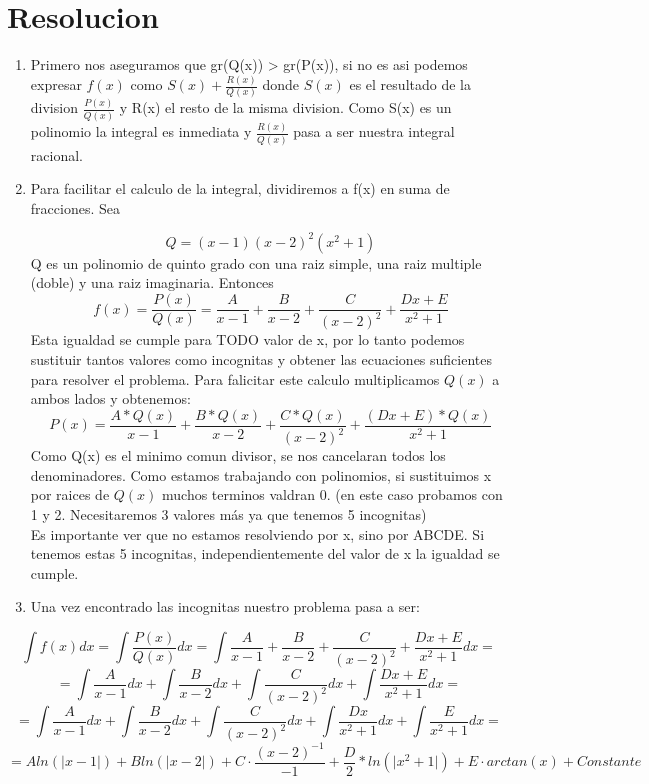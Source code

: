 \documentclass[11pt]{article}
\begin{document}
\section{Resolucion}
\label{sec:org24a41e5}
\begin{enumerate}
\item Primero nos aseguramos que gr(Q(x)) > gr(P(x)), si no es asi podemos expresar \(f(x)\)  como \(S(x) + \frac{R(x)}{Q(x)}\) donde \(S(x)\) es el resultado de la division \(\frac{P(x)}{Q(x)}\) y R(x) el resto de la misma division. Como S(x) es un polinomio la integral es inmediata y \(\frac{R(x)}{Q(x)}\) pasa a ser nuestra integral racional.

\item Para facilitar el calculo de la integral, dividiremos a f(x) en suma de fracciones. Sea

\[
Q = (x-1)(x-2)^{2}(x^{2}+1) 
\]
Q es un polinomio de quinto grado con una raiz simple, una raiz multiple (doble) y una raiz imaginaria. 
Entonces 
\[
f(x) = \frac{P(x)}{Q(x)} = \frac{A}{x-1} + \frac{B}{x-2} + \frac{C}{(x-2)^{2}} + \frac{Dx + E}{x^{2} + 1}
\]
Esta igualdad se cumple para TODO valor de x, por lo tanto podemos sustituir tantos valores como incognitas y obtener las ecuaciones suficientes para resolver el problema. Para falicitar este calculo multiplicamos \(Q(x)\) a ambos lados y obtenemos:
\[
P(x) = \frac{A*Q(x)}{x-1} + \frac{B*Q(x)}{x-2} + \frac{C*Q(x)}{(x-2)^{2}} + \frac{(Dx + E)*Q(x)}{x^{2} + 1}
\]
Como Q(x) es el minimo comun divisor, se nos cancelaran todos los denominadores. Como estamos trabajando con polinomios, si sustituimos x por raices de \(Q(x)\) muchos terminos valdran 0. (en este caso probamos con 1 y 2. Necesitaremos 3 valores más ya que tenemos 5 incognitas) \\
Es importante ver que no estamos resolviendo por x, sino por ABCDE. Si tenemos estas 5 incognitas, independientemente del valor de x la igualdad se cumple.
\item Una vez encontrado las incognitas nuestro problema pasa a ser:
\end{enumerate}
\[
\int f(x) dx = \int\frac{P(x)}{Q(x)} dx = \int \frac{A}{x-1} + \frac{B}{x-2} + \frac{C}{(x-2)^{2}} + \frac{Dx + E}{x^{2} + 1} dx =
\]
\[
= \int \frac{A}{x-1} dx + \int \frac{B}{x-2} dx + \int \frac{C}{(x-2)^{2}} dx + \int \frac{Dx + E}{x^{2} + 1} dx =
\]
\[
= \int \frac{A}{x-1} dx + \int \frac{B}{x-2} dx + \int \frac{C}{(x-2)^{2}} dx + \int \frac{Dx}{x^{2} + 1} dx + \int \frac{E}{x^{2}+1} dx =
\]
\[
= Aln(\lvert x-1 \rvert) + Bln(\lvert x-2 \rvert) + C \cdot \frac{(x-2)^{-1}}{-1} + \frac{D}{2}*ln(\lvert x^{2}+1 \rvert) + E\cdot arctan(x) + Constante
\]
\end{document}
